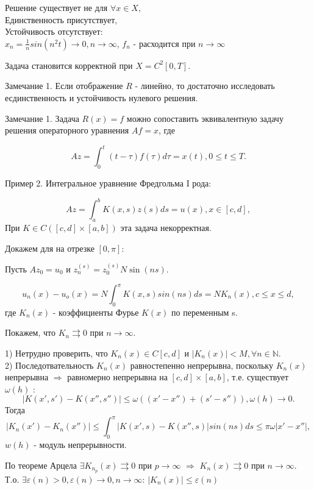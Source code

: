 \documentclass{article}
\begin{document}
Решение существует не для $\forall x \in X$,\\
Единственность присутствует,\\
Устойчивость отсутствует:\\
$x_n = \frac{1}{n} sin(n^2t) \rightarrow 0, n \rightarrow \infty$,
$f_n$ - расходится при $n \rightarrow \infty $

Задача становится корректной при $X = C^2[0,T]$.

Замечание 1. Если отображение $R$ - линейно, то достаточно исследовать есдинственность и устойчивость нулевого решения.

Замечание 1. Задача $R(x) = f$ можно сопоставить эквивалентную задачу решения операторного уравнения $Af = x$, где

$$
Az = \int_0^t (t - \tau) f(\tau) d \tau = x(t), 0 \leqslant t \leqslant T.
$$

Пример 2. Интегральное уравнение Фредгольма I рода:

$$
Az = \int_a^b K(x,s) z(s) ds = u(x), x \in [c,d],
$$
При $K \in C([c,d] \times [a,b])$ эта задача некорректная.

Докажем для на отрезке $[0,\pi]$:

Пусть $Az_0 = u_0$ и $z_n^{(s)} = z_0^{(s)} N \sin (ns)$.

$$
u_n(x) - u_o(x) = N \int_0^{\pi} K(x,s) sin(ns) ds = N K_n(x), c \leqslant x \leqslant d,  
$$
где $K_n(x)$ - коэффициенты Фурье $K(x)$ по переменным s.

Покажем, что $K_n \rightrightarrows 0$ при $n \rightarrow \infty $.

1) Нетрудно проверить, что $K_n(x) \in C[c,d]$ и $|K_n(x)| < M, \forall n \in \mathbb{N}$.\\

2) Последотвательность $K_n(x)$ равностепенно непрерывна, поскольку $K_n(x)$ непрерывна $\Rightarrow$ равномерно непрерывна на $[c,d] \times [a,b]$, 
т.е. существует $ \omega(h)$ : 
$$
|K(x',s') - K(x'',s'')| \leqslant \omega ((x' - x'') + (s' - s'')), \omega (h) \rightarrow 0.
$$ 
Тогда 
$$
|K_n(x') - K_n(x'')| \leqslant \int_0^{\pi} |K(x',s) - K(x'',s)| sin (ns) ds \leqslant \pi \omega |x' - x''|,
$$
$w(h)$ - модуль непрерывности.

По теореме Арцела $\exists K_{n_p}(x) \rightrightarrows 0$ при $p \rightarrow \infty $ $\Rightarrow$ $K_n(x) \rightrightarrows 0$ при $n \rightarrow \infty $.
 Т.о. $\exists \varepsilon(n) > 0, \varepsilon (n) \rightarrow 0, n \rightarrow \infty $: $|K_n(x)| \leqslant \varepsilon(n)$
\end{document}
